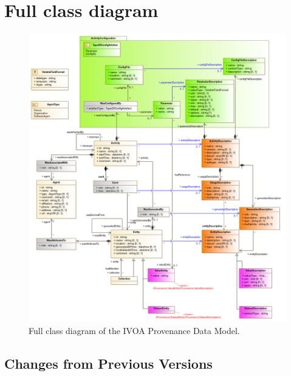 \documentclass[11pt,a4paper]{ivoa}
\begin{document}
\clearpage
\section{Full class diagram}
\label{sec:fulldiagram}

\begin{figure}[ht]
\centering
\hspace*{-.13\textwidth}
\includegraphics[width=1.2\textwidth]{PROV_Fig8.png}
\caption[Full class diagram of the IVOA Provenance Data Model]{Full class diagram of the IVOA Provenance Data Model.}
\label{fig:fulldiagram}
\end{figure}


\begin{appendices}

\clearpage

\section{Changes from Previous Versions}
\label{sec:changes}






\end{appendices}

\listoffigures

\listoftables


\end{document}
